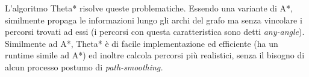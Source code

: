 \documentclass[12pt]{book}
\begin{document}

\par{
L'algoritmo Theta* risolve queste problematiche. Essendo una variante di A*, similmente propaga le informazioni lungo gli archi del grafo ma senza vincolare i percorsi trovati ad essi (i percorsi con questa caratteristica sono detti \emph{any-angle}). 
Similmente ad A*, Theta* \`e di facile implementazione ed efficiente (ha un runtime simile ad A*) ed inoltre calcola percorsi pi\`u realistici, senza il bisogno di alcun processo postumo di \emph{path-smoothing.} 
}
\end{document}
